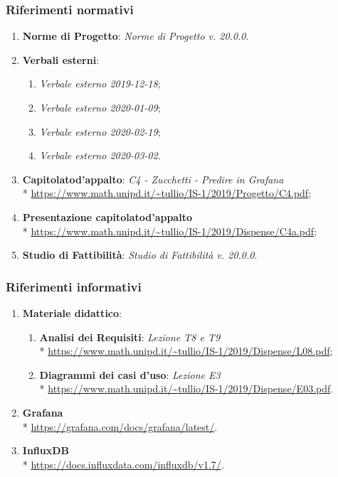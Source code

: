 		\subsubsection{Riferimenti normativi}
			\begin{enumerate}
				\item \textbf{Norme di Progetto}: \textit{Norme di Progetto v. 20.0.0}.
				\item \textbf{Verbali esterni}:
				\begin{enumerate}
					\item \textit{Verbale esterno 2019-12-18};
					\item \textit{Verbale esterno 2020-01-09};
					\item \textit{Verbale esterno 2020-02-19};
					\item \textit{Verbale esterno 2020-03-02}.
				\end{enumerate}
				\item \textbf{Capitolato}\glosp \textbf{d'appalto}: \textit{C4 - Zucchetti - Predire in Grafana}\glo \\*
				\url{https://www.math.unipd.it/~tullio/IS-1/2019/Progetto/C4.pdf};
				\item \textbf{Presentazione capitolato}\glosp \textbf{d'appalto} \\*
				\url{https://www.math.unipd.it/~tullio/IS-1/2019/Dispense/C4a.pdf};
				\item \textbf{Studio di Fattibilità}: \textit{Studio di Fattibilità v. 20.0.0}.
			\end{enumerate}
		\subsubsection{Riferimenti informativi}
			\begin{enumerate}
				\item \textbf{Materiale didattico}:
				\begin{enumerate}
					\item \textbf{Analisi dei Requisiti}: \textit{Lezione T8 e T9} \\*
					\url{https://www.math.unipd.it/~tullio/IS-1/2019/Dispense/L08.pdf};
					\item \textbf{Diagrammi dei casi d'uso}\glo: \textit{Lezione E3} \\*
					\url{https://www.math.unipd.it/~tullio/IS-1/2019/Dispense/E03.pdf}.
				\end{enumerate}
				\item \textbf{Grafana}\glo \\*
					\url{https://grafana.com/docs/grafana/latest/}.
				\item \textbf{InfluxDB} \\*
					\url{https://docs.influxdata.com/influxdb/v1.7/}.
			\end{enumerate}
